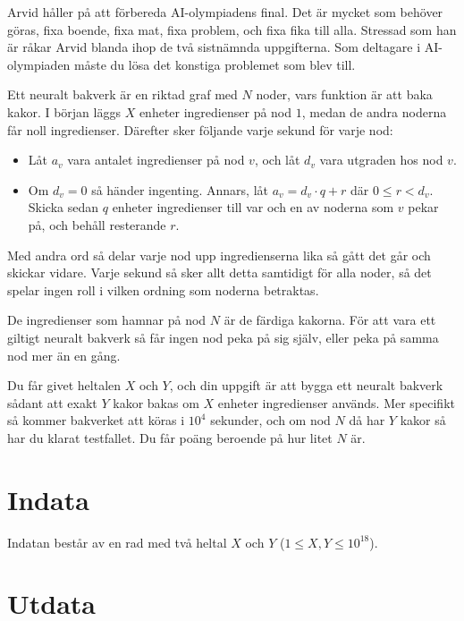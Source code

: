 \noindent

Arvid håller på att förbereda AI-olympiadens final. Det är mycket som behöver göras, 
fixa boende, fixa mat, fixa problem, och fixa fika till alla. Stressad som han är råkar
Arvid blanda ihop de två sistnämnda uppgifterna. Som deltagare i AI-olympiaden måste 
du lösa det konstiga problemet som blev till.

Ett neuralt bakverk är en riktad graf med $N$ noder, vars funktion är att baka kakor. 
I början läggs $X$ enheter ingredienser på nod $1$, medan de andra noderna får noll 
ingredienser. Därefter sker följande varje sekund för varje nod:


\begin{itemize}
\item Låt $a_v$ vara antalet ingredienser på nod $v$, och låt $d_v$ vara utgraden hos nod $v$.
\item Om $d_v = 0$ så händer ingenting. Annars, låt $a_v = d_v\cdot q + r$ där $0 \leq r < d_v$.
Skicka sedan $q$ enheter ingredienser till var och en av noderna som $v$ pekar på, och behåll resterande $r$.
\end{itemize}

Med andra ord så delar varje nod upp ingredienserna lika så gått det går och skickar 
vidare. Varje sekund så sker allt detta samtidigt för alla noder, så det spelar 
ingen roll i vilken ordning som noderna betraktas.

De ingredienser som hamnar på nod $N$ är de färdiga kakorna. 
För att vara ett giltigt neuralt bakverk så får ingen nod peka på 
sig själv, eller peka på samma nod mer än en gång.

Du får givet heltalen $X$ och $Y$, och din uppgift är att bygga ett neuralt 
bakverk sådant att exakt $Y$ kakor bakas om $X$ enheter ingredienser används. 
Mer specifikt så kommer bakverket att köras i $10^4$ sekunder, och om nod $N$ då 
har $Y$ kakor så har du klarat testfallet. Du får poäng beroende på hur litet $N$ är.


\section*{Indata}

Indatan består av en rad med två heltal $X$ och $Y$ ($1 \leq X,Y \leq 10^{18}$).

\section*{Utdata}

